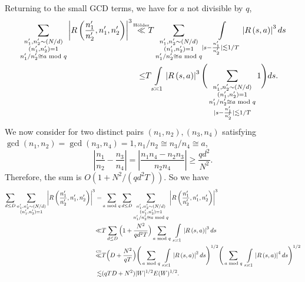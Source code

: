 Returning to the small GCD terms, we have for $a$ not divisible by $q$,
\begin{align*}
    \sum_{\substack{n_1',n_2'\sim (N/d)\\(n_1',n_2')=1\\n_1'/n_2'\cong a \mod q}}  \left|R\left(\frac{n_1'}{n_2'} ,n_1',n_2'\right) \right|^3
   \  \stackon{H\"older}{\ll}& \  T \sum_{\substack{n_1',n_2'\sim (N/d)\\(n_1',n_2')=1\\n_1'/n_2'\cong a \mod q}}\int\displaylimits_{|s-\frac{n_1'}{n_2'}|\lesssim 1/T}\left|R\left(s,a\right) \right|^3 ds\\
    \leq& T \int\displaylimits_{s\asymp 1} \left|R\left(s,a\right) \right|^3 \Bigg(\sum_{\substack{n_1',n_2'\sim (N/d)\\(n_1',n_2')=1\\n_1'/n_2'\cong a \mod q\\|s-\frac{n_1'}{n_2'}|\lesssim 1/T}} 1\Bigg)ds .
\end{align*}
We now consider for two distinct pairs $(n_1,n_2), (n_3,n_4)$ satisfying $\gcd(n_1,n_2)=\gcd(n_3,n_4)=1, n_1/n_2\cong n_3/n_4\cong a$, \[
\left|\frac{n_1}{n_2}-\frac{n_3}{n_4}\right|=\left|\frac{n_1n_4-n_2n_3}{n_2n_4}\right|\geq \frac{qd^2}{N^2}.
\]
Therefore, the sum is $O(1+{N^2}/({qd^2T}))$. So we have \begin{align*}
    \sum_{d\leq D}\sum_{\substack{n_1',n_2'\sim (N/d)\\(n_1',n_2')=1}}  \left|R\left(\frac{n_1'}{n_2'} ,n_1',n_2'\right) \right|^3 = &
   \sum_{a \mod q} \sum_{d\leq D}\sum_{\substack{n_1',n_2'\sim (N/d)\\(n_1',n_2')=1\\n_1'/n_2'\cong a \mod q}}  \left|R\left(\frac{n_1'}{n_2'} ,n_1',n_2'\right) \right|^3\\
   \ll& T \sum_{d\leq D}\Big(1+\frac{N^2}{qd^2T}\Big) \sum_{a \mod q}\ \int\displaylimits_{s\asymp 1} \left|R\left(s,a\right) \right|^3 ds\\
   \stackon{CS}{\ll}&T \Big(D+\frac{N^2}{qT}\Big)\Bigg(\sum_{a \mod q}\ \int\displaylimits_{s\asymp 1} \left|R\left(s,a\right) \right|^2 ds\Bigg)^{1/2}\Bigg(\sum_{a \mod q}\ \int\displaylimits_{s\asymp 1} \left|R\left(s,a\right) \right|^4 ds\Bigg)^{1/2}\\
   \lesssim& (qTD+N^2)|W|^{1/2}E(W)^{1/2}.
\end{align*}

